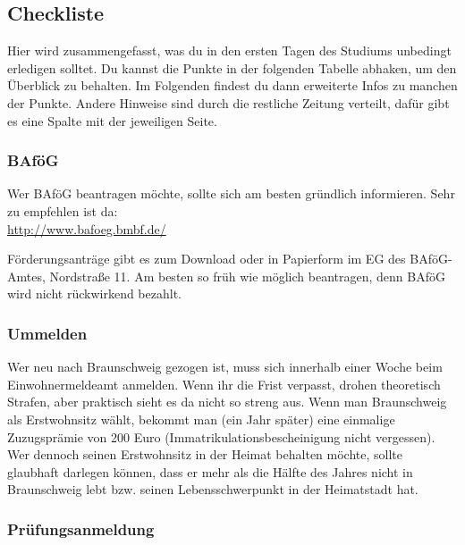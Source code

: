 
\subsection{Checkliste}
\label{checkliste}
\begin{multicols}{2}
	Hier wird zusammengefasst, was du in den ersten Tagen des Studiums
	unbedingt erledigen solltet. Du kannst die Punkte in der folgenden
	Tabelle abhaken, um den Überblick zu behalten.
	Im Folgenden findest du dann erweiterte Infos zu manchen der Punkte. 
	Andere Hinweise sind durch die restliche Zeitung verteilt, dafür 
	gibt es eine Spalte mit der jeweiligen Seite.
\end{multicols}


\begin{multicols}{2}
\subsubsection{BAföG}
	\label{todobafoeg}

	Wer BAföG beantragen möchte, sollte sich am besten gründlich informieren. Sehr zu empfehlen ist da: \\
	\url{http://www.bafoeg.bmbf.de/}
 
	Förderungsanträge gibt es zum Download oder in Papierform im
	EG des BAföG-Amtes, Nordstraße 11. Am besten so früh
	wie möglich beantragen, denn BAföG wird nicht rückwirkend
	bezahlt.


\subsubsection{Ummelden}
	\label{todoummelden}

	Wer neu nach Braunschweig gezogen ist, muss sich innerhalb einer Woche beim Einwohnermeldeamt anmelden. Wenn ihr die Frist verpasst, drohen theoretisch Strafen, aber praktisch sieht es da nicht so streng aus. Wenn man Braunschweig als Erstwohnsitz wählt, bekommt man (ein Jahr später) eine einmalige Zuzugsprämie von 200 Euro (Immatrikulationsbescheinigung nicht vergessen). Wer dennoch seinen Erstwohnsitz in der Heimat behalten möchte, sollte glaubhaft darlegen können, dass er mehr als die Hälfte des Jahres nicht in Braunschweig lebt bzw. seinen Lebensschwerpunkt in der Heimatstadt hat.

\subsubsection{Prüfungsanmeldung}
	\label{todoanmeldung}


\end{multicols}
